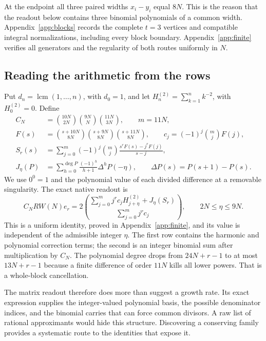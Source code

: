 \documentclass[11pt]{article}
\newcommand{\lcm}{\operatorname{lcm}}
\begin{document}
At the endpoint all three paired widths $x_i-y_i$ equal $8N$.
This is the reason that the readout below contains three binomial
polynomials of a common width. Appendix~\ref{app:blocks} records the
complete $t=3$ vertices and compatible integral normalizations, including
every block boundary. Appendix~\ref{app:finite} verifies all generators
and the regularity of both routes uniformly in $N$.

\subsection{Reading the arithmetic from the rows}
Put $d_n=\lcm(1,\ldots,n)$, with $d_0=1$, and let
$H_n^{(2)}=\sum_{k=1}^n k^{-2}$, with $H_0^{(2)}=0$.
Define
\[
\begin{split}
 C_N&=\binom{10N}{2N}\binom{9N}{N}\binom{11N}{3N},\qquad m=11N,\\
 F(s)&=\binom{s+10N}{8N}\binom{s+9N}{8N}\binom{s+11N}{8N},\qquad
 c_j=(-1)^j\binom mjF(j),\\
 S_r(s)&=\sum_{j=0}^m(-1)^j\binom mj
       \frac{s^rF(s)-j^rF(j)}{s-j},\\
 J_\eta(P)&=\sum_{h=0}^{\deg P}\frac{(-1)^h}{h+1}\Delta^hP(-\eta),
 \qquad \Delta P(s)=P(s+1)-P(s).
\end{split}
\]
We use $0^0=1$ and the polynomial value of each divided difference
at a removable singularity. The exact native readout is
\begin{equation}\label{eq:finite}
 C_NRW(N)e_r=
 2\binom{\displaystyle\sum_{j=0}^m j^rc_jH_{j+\eta}^{(2)}+J_\eta(S_r)}
        {\displaystyle\sum_{j=0}^m j^rc_j},
 \qquad 2N\le\eta\le9N.
\end{equation}
This is a uniform identity, proved in Appendix~\ref{app:finite}, and
its value is independent of the admissible integer $\eta$.
The first row contains the harmonic and polynomial correction terms;
the second is an integer binomial sum after multiplication by $C_N$.
The polynomial degree drops from $24N+r-1$ to at most $13N+r-1$
because a finite difference of order $11N$ kills all lower powers.
That is a whole-block cancellation.

The matrix readout therefore does more than suggest a growth rate.
Its exact expression supplies the integer-valued polynomial basis,
the possible denominator indices, and the binomial carries that can
force common divisors. A raw list of rational approximants would hide
this structure. Discovering a conserving family provides a systematic
route to the identities that expose it.
\end{document}
